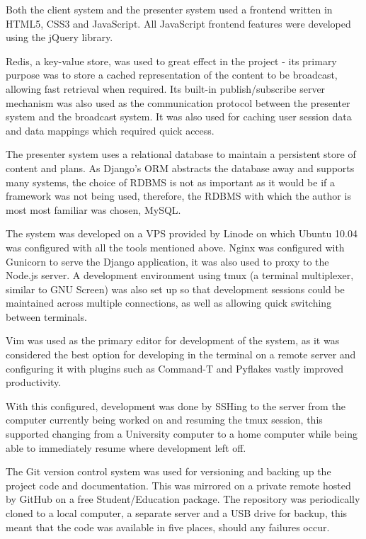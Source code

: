 \documentclass[a4papert,11pt,notitlepage]{ltxdoc}
\begin{document}
Both the client system and the presenter system used a frontend written in HTML5, CSS3 and JavaScript. All JavaScript frontend features were developed using the jQuery\cite{jquery:web} library.

Redis\cite{redis:web}, a key-value store, was used to great effect in the project - its primary purpose was to store a cached representation of the content to be broadcast, allowing fast retrieval when required. Its built-in publish/subscribe server mechanism was also used as the communication protocol between the presenter system and the broadcast system. It was also used for caching user session data and data mappings which required quick access.

The presenter system uses a relational database to maintain a persistent store of content and plans. As Django's ORM abstracts the database away and supports many systems, the choice of RDBMS is not as important as it would be if a framework was not being used, therefore, the RDBMS with which the author is most most familiar was chosen, MySQL\cite{mysql:web}.

The system was developed on a VPS provided by Linode on which Ubuntu 10.04 was configured with all the tools mentioned above. Nginx\cite{nginx:web} was configured with Gunicorn\cite{gunicorn:web} to serve the Django application, it was also used to proxy to the Node.js server. A development environment using tmux\cite{tmux:web} (a terminal multiplexer, similar to GNU Screen) was also set up so that development sessions could be maintained across multiple connections, as well as allowing quick switching between terminals.

Vim\cite{vim:web} was used as the primary editor for development of the system, as it was considered the best option for developing in the terminal on a remote server and configuring it with plugins such as Command-T and Pyflakes vastly improved productivity.

With this configured, development was done by SSHing to the server from the computer currently being worked on and resuming the tmux session, this supported changing from a University computer to a home computer while being able to immediately resume where development left off.

The Git\cite{git:web} version control system was used for versioning and backing up the project code and documentation. This was mirrored on a private remote hosted by GitHub\cite{github:web} on a free Student/Education package. The repository was periodically cloned to a local computer, a separate server and a USB drive for backup, this meant that the code was available in five places, should any failures occur.
\end{document}
